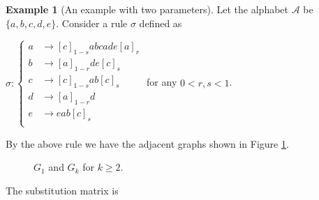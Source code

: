 \documentclass[a4]{amsart}
\theoremstyle{definition}
\newtheorem{ex}[theorem]{Example}
\begin{document}
\begin{ex}[An example with two parameters]
Let the alphabet $\mathcal{A}$ be $\{a,b,c,d,e\}$. Consider a rule $\sigma$ defined as 

\quad
$\sigma: \left\{\begin{aligned}
a&\longrightarrow [c]_{1-s}abcade[a]_r\\
b&\longrightarrow [a]_{1-r}de[c]_s\\
c&\longrightarrow [c]_{1-s}ab[c]_{s}\\
d&\longrightarrow [a]_{1-r}d\\
e&\longrightarrow eab[c]_s\\
\end{aligned}
\right.
$ for any $0< r,s <1$.

By the above rule we have the adjacent graphs shown in Figure \ref{Ex3-Gk}.

\begin{figure}[h] %
\hskip 0.1cm 
\caption{$G_1$ and $G_k$  for $k\geq 2$.}\label{Ex3-Gk}

\end{figure}


The substitution matrix is 


\end{ex}
\end{document}
